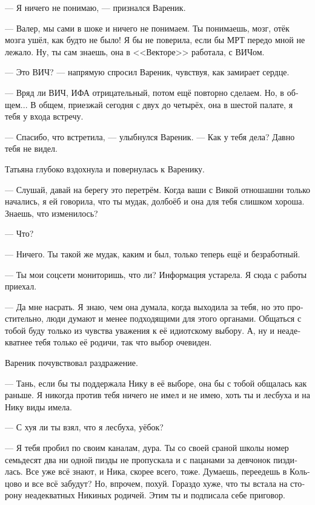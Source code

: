\documentclass[a5paper,12pt,fleqn]{extbook}\usepackage{cooltooltips}\usepackage{polyglossia}\setdefaultlanguage[babelshorthands=true]{russian}\setotherlanguage{english}\defaultfontfeatures{Ligatures=TeX,Mapping=tex-text} \usepackage{xcolor}\definecolor{lightgray}{HTML}{bbbbbb}\color{lightgray}\newcommand{\ml}[3]{\textenglish{\textcolor{black}{#3}}}
\newcommand{\asterism}{\vspace{1em}{\centering\Large\bfseries$\ast~\ast~\ast$\par}\vspace{1em}}
\newcommand{\textspace}{\vspace{1em}{\centering\Large\bfseries<...>\par}\vspace{1em}}
\begin{document}
--- Я ничего не понимаю, --- признался Вареник.

--- Валер, мы сами в шоке и ничего не понимаем.
Ты понимаешь, мозг, отёк мозга ушёл, как будто не было!
Я бы не поверила, если бы МРТ передо мной не лежало.
Ну, ты сам знаешь, она в <<Векторе>> работала, с ВИЧом.

--- Это ВИЧ? --- напрямую спросил Вареник, чувствуя, как замирает сердце.

--- Вряд ли ВИЧ, ИФА отрицательный, потом ещё повторно сделаем.
Но, в общем...
В общем, приезжай сегодня с двух до четырёх, она в шестой палате, я тебя у входа встречу.

\asterism

\textspace

--- Спасибо, что встретила, --- улыбнулся Вареник.
--- Как у тебя дела?
Давно тебя не видел.

Татьяна глубоко вздохнула и повернулась к Варенику.

--- Слушай, давай на берегу это перетрём.
Когда ваши с Викой отношашни только начались, я ей говорила, что ты мудак, долбоёб и она для тебя слишком хороша.
Знаешь, что изменилось?

--- Что?

--- Ничего.
Ты такой же мудак, каким и был, только теперь ещё и безработный.

--- Ты мои соцсети мониторишь, что ли?
Информация устарела.
Я сюда с работы приехал.

--- Да мне насрать.
Я знаю, чем она думала, когда выходила за тебя, но это простительно, люди думают и менее подходящими для этого органами.
Общаться с тобой буду только из чувства уважения к её идиотскому выбору.
А, ну и неадекватнее тебя только её родичи, так что выбор очевиден.

Вареник почувствовал раздражение.

--- Тань, если бы ты поддержала Нику в её выборе, она бы с тобой общалась как раньше.
Я никогда против тебя ничего не имел и не имею, хоть ты и лесбуха и на Нику виды имела.

--- С хуя ли ты взял, что я лесбуха, уёбок?

--- Я тебя пробил по своим каналам, дура.
Ты со своей сраной школы номер семьдесят два ни одной пизды не пропускала и с пацанами за девчонок пиздилась.
Все уже всё знают, и Ника, скорее всего, тоже.
Думаешь, переедешь в Кольцово и все всё забудут?
Но, впрочем, похуй.
Гораздо хуже, что ты встала на сторону неадекватных Никиных родичей.
Этим ты и подписала себе приговор.
\end{document}
